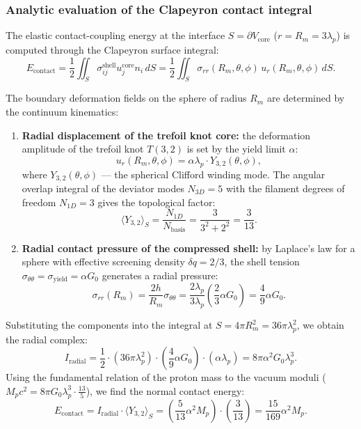 \documentclass[11pt,a4paper]{article}
\theoremstyle{definition}
\theoremstyle{remark}
\begin{document}
\subsubsection{Analytic evaluation of the Clapeyron contact integral}

The elastic contact-coupling energy at the interface $S = \partial V_{\mathrm{core}}$ ($r = R_m = 3\lambda_p$) is computed through the Clapeyron surface integral:
\begin{equation}
E_{\mathrm{contact}} = \frac{1}{2} \iint_{S} \sigma_{ij}^{\mathrm{shell}} u_j^{\mathrm{core}} n_i \, dS = \frac{1}{2} \iint_{S} \sigma_{rr}(R_m, \theta, \phi) \, u_r(R_m, \theta, \phi) \, dS.
\end{equation}

The boundary deformation fields on the sphere of radius $R_m$ are determined by the continuum kinematics:
\begin{enumerate}
\item \textbf{Radial displacement of the trefoil knot core:} the deformation amplitude of the trefoil knot $T(3,2)$ is set by the yield limit $\alpha$:
\begin{equation}
    u_r(R_m, \theta, \phi) = \alpha \lambda_p \cdot Y_{3,2}(\theta, \phi),
\end{equation}
where $Y_{3,2}(\theta, \phi)$ --- the spherical Clifford winding mode. The angular overlap integral of the deviator modes $N_{3D} = 5$ with the filament degrees of freedom $N_{1D} = 3$ gives the topological factor:
\begin{equation}
    \langle Y_{3,2} \rangle_S = \frac{N_{1D}}{N_{\mathrm{basis}}} = \frac{3}{3^2 + 2^2} = \frac{3}{13}.
\end{equation}
\item \textbf{Radial contact pressure of the compressed shell:} by Laplace's law for a sphere with effective screening density $\delta q = 2/3$, the shell tension $\sigma_{\theta\theta} = \sigma_{\mathrm{yield}} = \alpha G_0$ generates a radial pressure:
\begin{equation}
    \sigma_{rr}(R_m) = \frac{2h}{R_m} \sigma_{\theta\theta} = \frac{2\lambda_p}{3\lambda_p} \left(\frac{2}{3} \alpha G_0\right) = \frac{4}{9} \alpha G_0.
\end{equation}
\end{enumerate}

Substituting the components into the integral at $S = 4\pi R_m^2 = 36\pi \lambda_p^2$, we obtain the radial complex:
\begin{equation}
I_{\mathrm{radial}} = \frac{1}{2} \cdot (36\pi \lambda_p^2) \cdot \left(\frac{4}{9} \alpha G_0\right) \cdot (\alpha \lambda_p) = 8\pi \alpha^2 G_0 \lambda_p^3.
\end{equation}
Using the fundamental relation of the proton mass to the vacuum moduli ($M_p c^2 = 8\pi G_0 \lambda_p^3 \cdot \frac{13}{5}$), we find the normal contact energy:
\begin{equation}
E_{\mathrm{contact}} = I_{\mathrm{radial}} \cdot \langle Y_{3,2} \rangle_S = \left(\frac{5}{13} \alpha^2 M_p\right) \cdot \left(\frac{3}{13}\right) = \frac{15}{169} \alpha^2 M_p.
\end{equation}
\end{document}
